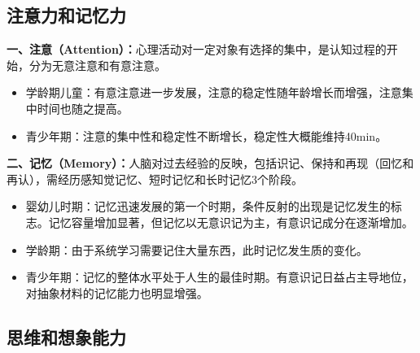 \subsection{注意力和记忆力}

\begin{keybox}
\textbf{一、注意（Attention）：}心理活动对一定对象有选择的集中，是认知过程的开始，分为无意注意和有意注意。

\begin{itemize}[leftmargin=*]
    \item 学龄期儿童：有意注意进一步发展，注意的稳定性随年龄增长而增强，注意集中时间也随之提高。
    \item 青少年期：注意的集中性和稳定性不断增长，稳定性大概能维持40min。
\end{itemize}

\textbf{二、记忆（Memory）：}人脑对过去经验的反映，包括识记、保持和再现（回忆和再认），需经历感知觉记忆、短时记忆和长时记忆3个阶段。

\begin{itemize}[leftmargin=*]
    \item 婴幼儿时期：记忆迅速发展的第一个时期，条件反射的出现是记忆发生的标志。记忆容量增加显著，但记忆以无意识记为主，有意识记成分在逐渐增加。
    \item 学龄期：由于系统学习需要记住大量东西，此时记忆发生质的变化。
    \item 青少年期：记忆的整体水平处于人生的最佳时期。有意识记日益占主导地位，对抽象材料的记忆能力也明显增强。
\end{itemize}
\end{keybox}

\subsection{思维和想象能力}

